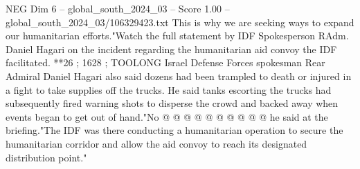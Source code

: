 \begin{textsample}{NEG Dim 6 – global\_south\_2024\_03 – Score 1.00 – global\_south\_2024\_03/106329423.txt}
This is why we are seeking ways to expand our humanitarian efforts."Watch the full statement by IDF Spokesperson RAdm.
Daniel Hagari on the incident regarding the humanitarian aid convoy the IDF facilitated. **26 ; 1628 ; TOOLONG Israel Defense Forces spokesman Rear Admiral Daniel Hagari also said dozens had been trampled to death or injured in a fight to take supplies off the trucks.
He said tanks escorting the trucks had subsequently fired warning shots to disperse the crowd and backed away when events began to get out of hand."No @ @ @ @ @ @ @ @ @ @ he said at the briefing."The IDF was there conducting a humanitarian operation to secure the humanitarian corridor and allow the aid convoy to reach its designated distribution point."

\end{textsample}
